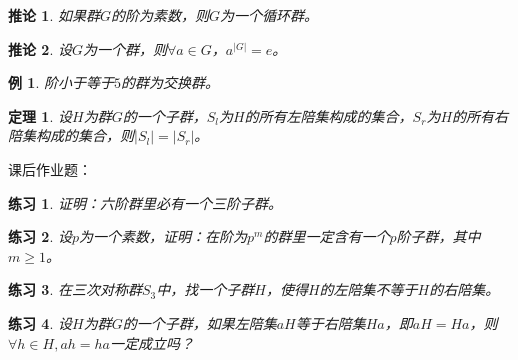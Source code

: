 \documentclass{article}
\newtheorem{Thm}{定理}
\newtheorem{Exercise}{练习}
\newtheorem*{Example}{例}
\newtheorem{Cor}{推论}
\begin{document}
\begin{CJK*}{UTF8}{gbsn}
\begin{Cor}
  如果群$G$的阶为素数，则$G$为一个循环群。
\end{Cor}

\begin{Cor}
  设$G$为一个群，则$\forall a\in G$，$a^{|G|}=e$。
\end{Cor}

\begin{Example}
  阶小于等于$5$的群为交换群。
\end{Example}

\begin{Thm}
  设$H$为群$G$的一个子群，$S_l$为$H$的所有左陪集构成的集合，$S_r$为$H$的所有右陪集构成的集合，则$|S_l|=|S_r|$。
\end{Thm}


课后作业题：
\begin{Exercise}
证明：六阶群里必有一个三阶子群。
\end{Exercise}

\begin{Exercise}
设$p$为一个素数，证明：在阶为$p^m$的群里一定含有一个$p$阶子群，其中$m\geq 1$。
\end{Exercise}

\begin{Exercise}
在三次对称群$S_3$中，找一个子群$H$，使得$H$的左陪集不等于$H$的右陪集。
\end{Exercise}
\begin{Exercise}
设$H$为群$G$的一个子群，如果左陪集$aH$等于右陪集$Ha$，即$aH=Ha$，则$\forall h\in H, ah=ha$一定成立吗？
\end{Exercise}
\end{CJK*}
\end{document}
